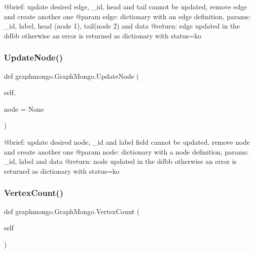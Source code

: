\begin{DoxyVerb}@brief: update desired edge, _id, head and tail cannot be updated, remove edge and create another one
@param edge: dictionary with an edge definition, params: _id, label, head (node 1), tail(node 2) and data
@return: edge updated in the ddbb otherwise an error is returned as dictionary with status=ko
\end{DoxyVerb}
 \hypertarget{classgraphmongo_1_1GraphMongo_a09a2ea8847630acec5cdaab591ce82c0}{}\label{classgraphmongo_1_1GraphMongo_a09a2ea8847630acec5cdaab591ce82c0} 
\subsubsection{\texorpdfstring{Update\+Node()}{UpdateNode()}}
{\footnotesize\ttfamily def graphmongo.\+Graph\+Mongo.\+Update\+Node (\begin{DoxyParamCaption}\item[{}]{self,  }\item[{}]{node = {\ttfamily None} }\end{DoxyParamCaption})}

\begin{DoxyVerb}@brief: update desired node, _id and label field cannot be updated, remove node and create another one
@param node: dictionary with a node definition, params: _id, label and data
@return: node updated in the ddbb otherwise an error is returned as dictionary with status=ko
\end{DoxyVerb}
 \hypertarget{classgraphmongo_1_1GraphMongo_af69f7a68ca1699c1586c71763c065d7c}{}\label{classgraphmongo_1_1GraphMongo_af69f7a68ca1699c1586c71763c065d7c} 
\subsubsection{\texorpdfstring{Vertex\+Count()}{VertexCount()}}
{\footnotesize\ttfamily def graphmongo.\+Graph\+Mongo.\+Vertex\+Count (\begin{DoxyParamCaption}\item[{}]{self }\end{DoxyParamCaption})}



